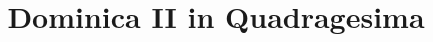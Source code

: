 \documentclass[17pt]{extarticle}
\begin{document}
\title{Dominica II in Quadragesima}
\makereadingtitle

\end{document}

